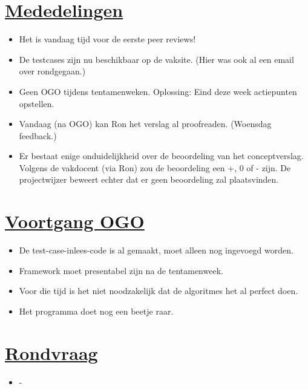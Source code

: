 \documentclass[a4paper]{article}
\begin{document}
\section{\underline{Mededelingen}} %
\label{sec:mededelingen}

\begin{itemize}
\item Het is vandaag tijd voor de eerste peer reviews!
\item De testcases zijn nu beschikbaar op de vaksite. (Hier was ook al een email over rondgegaan.)
\item Geen OGO tijdens tentamenweken. Oplossing: Eind deze week actiepunten opstellen.
\item Vandaag (na OGO) kan Ron het verslag al proofreaden. (Woensdag feedback.)
\item Er bestaat enige onduidelijkheid over de beoordeling van het conceptverslag. Volgens de vakdocent (via Ron) zou de beoordeling een +, 0 of - zijn. De projectwijzer beweert echter dat er geen beoordeling zal plaatsvinden.
\end{itemize}


\section{\underline{Voortgang OGO}} %
\label{sec:voortgang_ogo}
    
\begin{itemize}
\item De test-case-inlees-code is al gemaakt, moet alleen nog ingevoegd worden.
\item Framework moet presentabel zijn na de tentamenweek.
\item Voor die tijd is het niet noodzakelijk dat de algoritmes het al perfect doen.
\item Het programma doet nog een beetje raar.
\end{itemize}


\section{\underline{Rondvraag}} %
\label{sec:rondvraag}

\begin{itemize}
\item -
\end{itemize}
\end{document}
